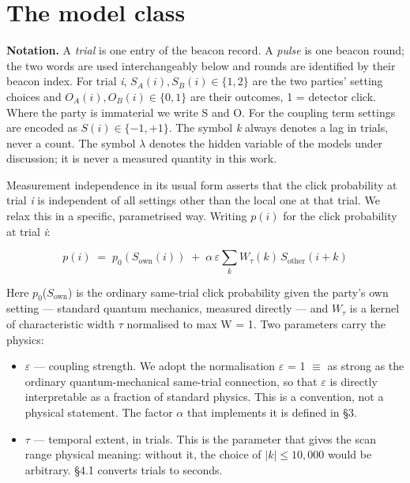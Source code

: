 \documentclass[
  11pt,
]{article}
\providecommand{\tightlist}{%
  \setlength{\itemsep}{0pt}\setlength{\parskip}{0pt}}
\begin{document}
\section{The model class}

\textbf{Notation.} A \emph{trial} is one entry of the beacon record. A
\emph{pulse} is one beacon round; the two words are used interchangeably
below and rounds are identified by their beacon index. For trial
\emph{i}, \(S_A(i), S_B(i) \in \{1,2\}\) are the two parties' setting
choices and \(O_A(i), O_B(i) \in \{0,1\}\) are their outcomes, 1 =
detector click. Where the party is immaterial we write S and O. For the
coupling term settings are encoded as \(S(i)\in\{-1,+1\}\). The symbol
\emph{k} always denotes a lag in trials, never a count. The symbol
\(\lambda\) denotes the hidden variable of the models under discussion;
it is never a measured quantity in this work.

Measurement independence in its usual form asserts that the click
probability at trial \emph{i} is independent of all settings other than
the local one at that trial. We relax this in a specific, parametrised
way. Writing \(p(i)\) for the click probability at trial \emph{i}:

\begin{equation}
p(i) \;=\; p_0\!\left(S_{\mathrm{own}}(i)\right) \;+\; \alpha\,\varepsilon \sum_k W_\tau(k)\, S_{\mathrm{other}}(i+k)
\label{eq:model}
\end{equation}

Here \(p_{0}\)(\(S_{\mathrm{own}}\)) is the ordinary same-trial click
probability given the party's own setting --- standard quantum
mechanics, measured directly --- and \(W_{\tau}\) is a kernel of
characteristic width \(\tau\) normalised to max W = 1. Two parameters
carry the physics:

\begin{itemize}
\tightlist
\item
  \textbf{\(\varepsilon\)} --- coupling strength. We adopt the
  normalisation \(\varepsilon\) = 1 \(\equiv\) as strong as the ordinary
  quantum-mechanical same-trial connection, so that \(\varepsilon\) is
  directly interpretable as a fraction of standard physics. This is a
  convention, not a physical statement. The factor \(\alpha\) that
  implements it is defined in \S3.
\item
  \textbf{\(\tau\)} --- temporal extent, in trials. This is the
  parameter that gives the scan range physical meaning: without it, the
  choice of \(|k| \le 10{,}000\) would be arbitrary. \S4.1 converts
  trials to seconds.
\end{itemize}
\end{document}

